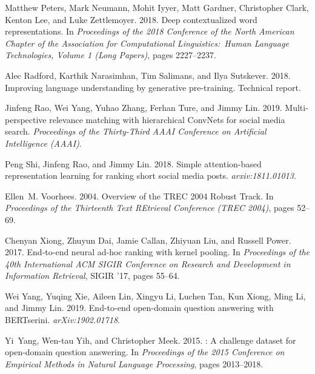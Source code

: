 \documentclass[11pt,a4paper]{article}
\begin{document}
\begin{thebibliography}{26}
Matthew Peters, Mark Neumann, Mohit Iyyer, Matt Gardner, Christopher Clark,
  Kenton Lee, and Luke Zettlemoyer. 2018.
\newblock Deep contextualized word representations.
\newblock In \emph{Proceedings of the 2018 Conference of the North American
  Chapter of the Association for Computational Linguistics:\ Human Language
  Technologies, Volume 1 (Long Papers)}, pages 2227--2237.

Alec Radford, Karthik Narasimhan, Tim Salimans, and Ilya Sutskever. 2018.
\newblock Improving language understanding by generative pre-training.
\newblock Technical report.

Jinfeng Rao, Wei Yang, Yuhao Zhang, Ferhan Ture, and Jimmy Lin. 2019.
\newblock Multi-perspective relevance matching with hierarchical {ConvNets} for
  social media search.
\newblock \emph{Proceedings of the Thirty-Third AAAI Conference on Artificial
  Intelligence (AAAI)}.

Peng Shi, Jinfeng Rao, and Jimmy Lin. 2018.
\newblock Simple attention-based representation learning for ranking short
  social media posts.
\newblock \emph{arxiv:1811.01013}.

Ellen~M. Voorhees. 2004.
\newblock Overview of the {TREC} 2004 {Robust} {Track}.
\newblock In \emph{Proceedings of the Thirteenth Text REtrieval Conference
  (TREC 2004)}, pages 52--69.

Chenyan Xiong, Zhuyun Dai, Jamie Callan, Zhiyuan Liu, and Russell Power. 2017.
\newblock End-to-end neural ad-hoc ranking with kernel pooling.
\newblock In \emph{Proceedings of the 40th International ACM SIGIR Conference
  on Research and Development in Information Retrieval}, SIGIR '17, pages
  55--64.

Wei Yang, Yuqing Xie, Aileen Lin, Xingyu Li, Luchen Tan, Kun Xiong, Ming Li,
  and Jimmy Lin. 2019.
\newblock End-to-end open-domain question answering with {BERTserini}.
\newblock \emph{arXiv:1902.01718}.

Yi~Yang, Wen-tau Yih, and Christopher Meek. 2015.
: A challenge dataset for open-domain question answering.
\newblock In \emph{Proceedings of the 2015 Conference on Empirical Methods in
  Natural Language Processing}, pages 2013--2018.


\end{thebibliography}
\end{document}
